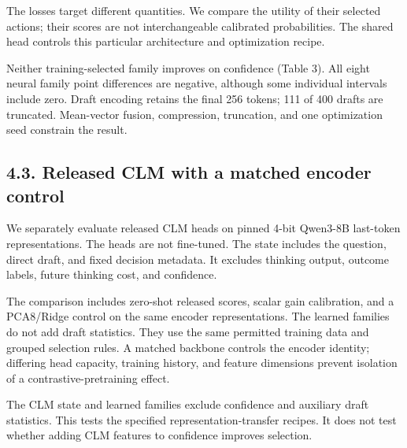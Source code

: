 \documentclass[11pt,a4paper]{article}
\begin{document}
The losses target different quantities. We compare the utility of their selected actions; their scores are not interchangeable calibrated probabilities. The shared head controls this particular architecture and optimization recipe.

Neither training-selected family improves on confidence (Table 3). All eight neural family point differences are negative, although some individual intervals include zero. Draft encoding retains the final 256 tokens; 111 of 400 drafts are truncated. Mean-vector fusion, compression, truncation, and one optimization seed constrain the result.

\subsection*{4.3. Released CLM with a matched encoder control}\label{sec:43-released-clm-with-a-matched-encoder-control}
We separately evaluate released CLM heads on pinned 4-bit Qwen3-8B last-token representations. The heads are not fine-tuned. The state includes the question, direct draft, and fixed decision metadata. It excludes thinking output, outcome labels, future thinking cost, and confidence.

The comparison includes zero-shot released scores, scalar gain calibration, and a PCA8/Ridge control on the same encoder representations. The learned families do not add draft statistics. They use the same permitted training data and grouped selection rules. A matched backbone controls the encoder identity; differing head capacity, training history, and feature dimensions prevent isolation of a contrastive-pretraining effect.

The CLM state and learned families exclude confidence and auxiliary draft statistics. This tests the specified representation-transfer recipes. It does not test whether adding CLM features to confidence improves selection.
\end{document}
